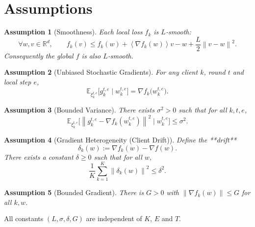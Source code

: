 \documentclass{article}
\newtheorem{assumption}{Assumption}
\newcommand{\E}{\mathbb{E}}
\newcommand{\norm}[1]{\left\|#1\right\|}
\newcommand{\inner}[1]{\left\langle #1 \right\rangle}
\begin{document}
\section*{Assumptions}
\begin{assumption}[Smoothness]\label{as:smooth}
Each local loss $f_k$ is $L$‑smooth:
\[
\forall w,v\in\mathbb{R}^d,\qquad
f_k(v)\le f_k(w)+\inner{\nabla f_k(w)}{v-w}+\frac{L}{2}\norm{v-w}^2 .
\]
Consequently the global $f$ is also $L$‑smooth.
\end{assumption}

\begin{assumption}[Unbiased Stochastic Gradients]\label{as:unbiased}
For any client $k$, round $t$ and local step $e$,
\[
\E_{\xi_{k}^{t,e}}\!\bigl[g_{k}^{t,e}\mid w_{k}^{t,e}\bigr]=\nabla f_k\!\bigl(w_{k}^{t,e}\bigr).
\]
\end{assumption}

\begin{assumption}[Bounded Variance]\label{as:var}
There exists $\sigma^2>0$ such that for all $k,t,e$,
\[
\E_{\xi_{k}^{t,e}}\!\bigl[\norm{g_{k}^{t,e}-\nabla f_k(w_{k}^{t,e})}^2\mid w_{k}^{t,e}\bigr]\le\sigma^2 .
\]
\end{assumption}

\begin{assumption}[Gradient Heterogeneity (Client Drift)]\label{as:drift}
Define the **drift** 
\[
\delta_k(w):=\nabla f_k(w)-\nabla f(w).
\]
There exists a constant $\delta\ge0$ such that for all $w$,
\[
\frac1K\sum_{k=1}^{K}\norm{\delta_k(w)}^2\le\delta^2 .
\tag{4}
\]
\end{assumption}

\begin{assumption}[Bounded Gradient]\label{as:bound}
There is $G>0$ with $\norm{\nabla f_k(w)}\le G$ for all $k,w$.
\end{assumption}

All constants $(L,\sigma,\delta,G)$ are independent of $K$, $E$ and $T$.

\end{document}
